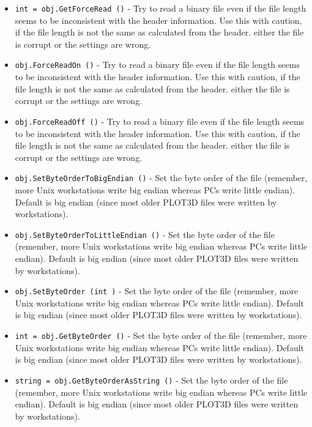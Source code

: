 \begin{itemize}
\item  \verb|int = obj.GetForceRead ()| -  Try to read a binary file even if the file length seems to be
 inconsistent with the header information. Use this with caution,
 if the file length is not the same as calculated from the header.
 either the file is corrupt or the settings are wrong. 

\item  \verb|obj.ForceReadOn ()| -  Try to read a binary file even if the file length seems to be
 inconsistent with the header information. Use this with caution,
 if the file length is not the same as calculated from the header.
 either the file is corrupt or the settings are wrong. 

\item  \verb|obj.ForceReadOff ()| -  Try to read a binary file even if the file length seems to be
 inconsistent with the header information. Use this with caution,
 if the file length is not the same as calculated from the header.
 either the file is corrupt or the settings are wrong. 

\item  \verb|obj.SetByteOrderToBigEndian ()| -  Set the byte order of the file (remember, more Unix workstations
 write big endian whereas PCs write little endian). Default is
 big endian (since most older PLOT3D files were written by
 workstations).

\item  \verb|obj.SetByteOrderToLittleEndian ()| -  Set the byte order of the file (remember, more Unix workstations
 write big endian whereas PCs write little endian). Default is
 big endian (since most older PLOT3D files were written by
 workstations).

\item  \verb|obj.SetByteOrder (int )| -  Set the byte order of the file (remember, more Unix workstations
 write big endian whereas PCs write little endian). Default is
 big endian (since most older PLOT3D files were written by
 workstations).

\item  \verb|int = obj.GetByteOrder ()| -  Set the byte order of the file (remember, more Unix workstations
 write big endian whereas PCs write little endian). Default is
 big endian (since most older PLOT3D files were written by
 workstations).

\item  \verb|string = obj.GetByteOrderAsString ()| -  Set the byte order of the file (remember, more Unix workstations
 write big endian whereas PCs write little endian). Default is
 big endian (since most older PLOT3D files were written by
 workstations).


\end{itemize}
